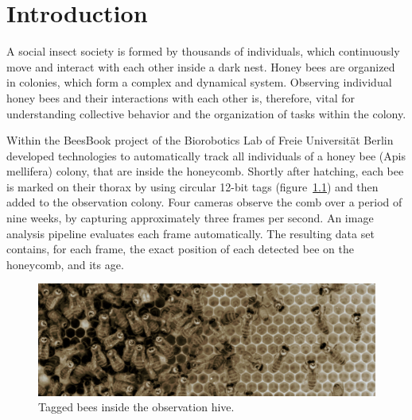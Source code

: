 \chapter{Introduction}
\label{ch:intro}

A social insect society is formed by thousands of individuals, which continuously move and interact with each other inside a dark nest. 
Honey bees are organized in colonies, which form a complex and dynamical system.
Observing individual honey bees and their interactions with each other is, therefore, vital for understanding collective behavior and the organization of tasks within the colony.

Within the BeesBook project of the Biorobotics Lab of Freie Universität Berlin~\textcite{wario2015automatic} developed technologies to automatically track all individuals of a honey bee (Apis mellifera) colony, that are inside the honeycomb.
Shortly after hatching, each bee is marked on their thorax by using circular 12-bit tags (figure~\ref{fig:markers}) and then added to the observation colony. Four cameras observe the comb over a period of nine weeks, by capturing approximately three frames per second. An image analysis pipeline evaluates each frame automatically. The resulting data set contains, for each frame, the exact position of each detected bee on the honeycomb, and its age.

\begin{figure}[b]
	\centering
	\includegraphics[width=1.0\textwidth]{Figures/markers}
	\caption{Tagged bees inside the observation hive.}
	\label{fig:markers}
\end{figure}

